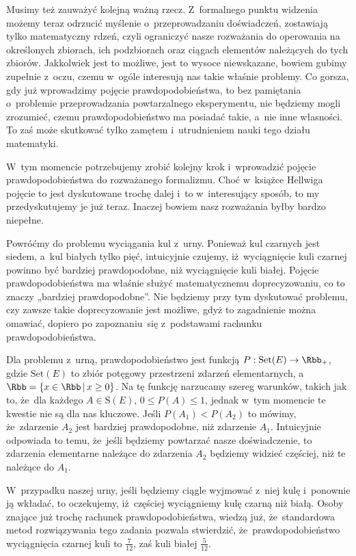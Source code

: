 \documentclass[a4paper,11pt]{article}
\numberwithin{equation}{section}
\begin{document}
Musimy też zauważyć kolejną ważną rzecz. Z~formalnego punktu widzenia możemy
teraz odrzucić myślenie o~przeprowadzaniu doświadczeń, zostawiają tylko
matematyczny rdzeń, czyli ograniczyć nasze rozważania do operowania
na określonych zbiorach, ich podzbiorach oraz ciągach elementów należących
do tych zbiorów. Jakkolwiek jest
to możliwe, jest to wysoce niewskazane, bowiem gubimy zupełnie z~oczu, czemu
w~ogóle interesują nas takie właśnie problemy. Co gorsza, gdy już
wprowadzimy pojęcie prawdopodobieństwa, to bez pamiętania o~problemie
przeprowadzania powtarzalnego eksperymentu, nie będziemy mogli zrozumieć,
czemu prawdopodobieństwo ma posiadać takie, a~nie inne własności. To zaś
może skutkować tylko zamętem i~utrudnieniem nauki tego działu matematyki.

W~tym momencie potrzebujemy zrobić kolejny krok i~wprowadzić pojęcie
prawdopodobieństwa do rozważanego formalizmu. Choć w~książce Hellwiga
pojęcie to jest dyskutowane trochę dalej i~to w~interesujący sposób, to my
przedyskutujemy je już teraz. Inaczej bowiem nasz rozważania byłby bardzo
niepełne.

Powróćmy do problemu wyciągania kul z~urny. Ponieważ kul czarnych jest
siedem, a~kul białych tylko pięć, intuicyjnie czujemy, iż~wyciągnięcie kuli
czarnej powinno być bardziej prawdopodobne, niż wyciągnięcie kuli białej.
Pojęcie prawdopodobieństwa ma właśnie służyć matematycznemu doprecyzowaniu,
co to znaczy „bardziej prawdopodobne”. Nie będziemy przy tym dyskutować
problemu, czy zawsze takie doprecyzowanie jest możliwe, gdyż to zagadnienie
można omawiać, dopiero po zapoznaniu~się z~podstawami rachunku
prawdopodobieństwa.

Dla problemu z~urną, prawdopodobieństwo jest funkcją
$P : \text{Set}( E ) \to \Rbb_{ + }$, gdzie $\text{Set}( E )$ to zbiór
potęgowy przestrzeni zdarzeń elementarnych,
a~$\Rbb = \{ x \in \Rbb \, | \, x \geq 0 \}$. Na tę funkcję narzucamy szereg
warunków, takich jak to, że~dla każdego
$A \in \text{S}( E )$, $0 \leq P( A ) \leq 1$, jednak w~tym momencie te kwestie nie
są dla nas kluczowe. Jeśli $P( A_{ 1 } ) < P( A_{ 2 } )$ to mówimy,
że~zdarzenie $A_{ 2 }$ jest bardziej prawdopodobne, niż zdarzenie $A_{ 1 }$.
Intuicyjnie odpowiada to temu,
że~jeśli będziemy powtarzać nasze doświadczenie, to zdarzenia elementarne
należące do zdarzenia $A_{ 2 }$ będziemy widzieć częściej, niż te należące
do $A_{ 1 }$.

W~przypadku naszej urny, jeśli będziemy ciągle wyjmować z~niej
kulę i~ponownie ją wkładać, to oczekujemy, iż~częściej wyciągniemy kulę
czarną niż białą. Osoby znające już trochę rachunek prawdopodobieństwa,
wiedzą już, że~standardowa metod rozwiązywania tego zadania pozwala
stwierdzić, że~prawdopodobieństwo wyciągnięcia czarnej kuli to
$\frac{ 7 }{ 12 }$, zaś kuli białej $\frac{ 5 }{ 12 }$.
\end{document}
